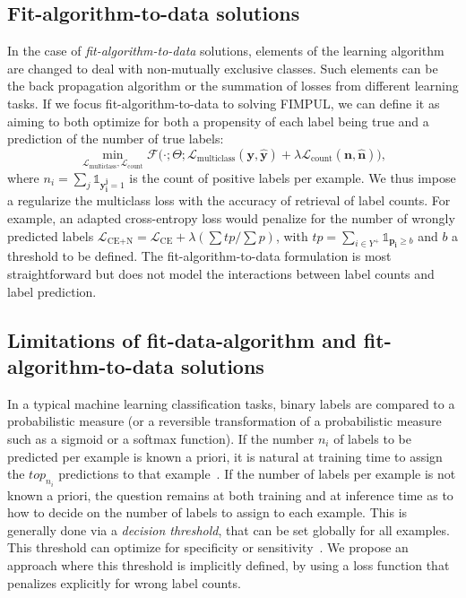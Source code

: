 \subsection{Fit-algorithm-to-data solutions}
\label{section:background:fitalgorithm}
In the case of \emph{fit-algorithm-to-data} solutions, elements of the learning algorithm are changed to deal with non-mutually exclusive classes. Such elements can be the back propagation algorithm or the summation of losses from different learning tasks.
If we focus fit-algorithm-to-data to solving FIMPUL, we can define it as aiming to both optimize for both a propensity of each label being true and a prediction of the number of true labels:
%
\begin{equation}
\underset{\mathcal{L}_{\text {multiclass}}, \mathcal{L}_{\text {count}}}
{\min} \mathcal{F}\big(\cdot ; \Theta; \mathcal{L}_{\text {multiclass}}
(\mathbf{y}, \hat{\mathbf{y}}) + \lambda \mathcal{L}_{\text {count}}
(\mathbf{n}, \hat{\mathbf{n}})\big),
\end{equation}
%
where \(n_i = \sum_j \mathds{1}_{\mathbf{y_i^j} = 1}\) is the count of
positive labels per example. We thus impose a regularize the multiclass loss with the accuracy of retrieval of label counts. 
For example, an adapted cross-entropy loss would penalize for the number of wrongly predicted
labels \(\mathcal{L}_{\text {CE+N}}= \mathcal{L}_{\text {CE}} + \lambda (\sum
tp / \sum p)\), with \(t p=\sum_{i \in Y^{+}} \mathds{1}_{\mathbf{p_i} \geq
b}\) and \(b\) a threshold to be defined. The fit-algorithm-to-data
formulation is most straightforward but does not model the interactions between label counts and label prediction.

\subsection{Limitations of fit-data-algorithm and fit-algorithm-to-data solutions}
\label{section:background:limitations}

In a typical machine learning classification tasks, binary labels are compared to a probabilistic measure (or a reversible
transformation of a probabilistic measure such as a sigmoid or a softmax
function). If the number $n_i$ of labels to be predicted per
example is known a priori, it is natural at training time to assign the $top_{n_i}$ predictions
to that example~\cite{lossTopKError, topKmulticlassSVM}. If the number of
labels per example is not known a priori, the question remains at both training and at inference time
as to how to decide on the number of labels to assign to each
example. This is generally done via a \emph{decision threshold}, that can be set globally for all
examples. This threshold can optimize for specificity or
sensitivity~\cite{decisionThreshold}. We propose an approach where this threshold
is implicitly defined, by using a loss function that penalizes explicitly for wrong label counts.

